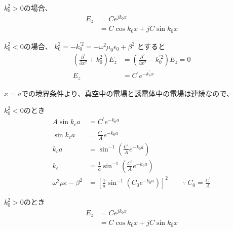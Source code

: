 \documentclass[a4paper,10pt]{bxjsarticle}
\begin{document}
$k_0^2 > 0$の場合、
\begin{align*}
    E_z &= C e^{j k_0 x} \\
        &= C \cos k_0 x + j C \sin k_0 x
\end{align*}

$k_0^2 < 0$の場合、
$k_0^2 = - k_0^{\prime 2} = - \omega^2 \mu_0 \epsilon_0 + \beta^2$ とすると
\begin{align*}
    \left( 
        \frac{\partial^2}{\partial x^2} 
        + k_0^2
    \right) E_z
    & =
    \left( 
        \frac{\partial^2}{\partial x^2} 
        - k_0^{\prime 2}
    \right) E_z
    = 0 \\
    E_z &= C^\prime e^{- k_0^\prime x}
\end{align*}

$x=a$での境界条件より、真空中の電場と誘電体中の電場は連続なので、

$k_0^2 < 0$のとき
\begin{align*}
    A \sin k_c a & = C^\prime e^{- k_0 a} \\
    \sin k_c a & = \frac{C^\prime}{A} e^{- k_0 a} \\
    k_c a & = \sin^{-1} \left( \frac{C^\prime}{A} e^{- k_0 a} \right) \\
    k_c & = \frac{1}{a} \sin^{-1} \left( \frac{C^\prime}{A} e^{- k_0 a} \right) \\
    \omega^2 \mu \epsilon - \beta^2 &= 
        \left[ 
            \frac{1}{a} \sin^{-1} \left( C_0 e^{- k_0 a} \right)
        \right]^2 \qquad
    \because \ C_0 = \frac{C^\prime}{A}
\end{align*}

$k_0^2 > 0$のとき
\begin{align*}
    E_z &= C e^{j k_0 x} \\
        &= C \cos k_0 x + j C \sin k_0 x
\end{align*}
\end{document}
